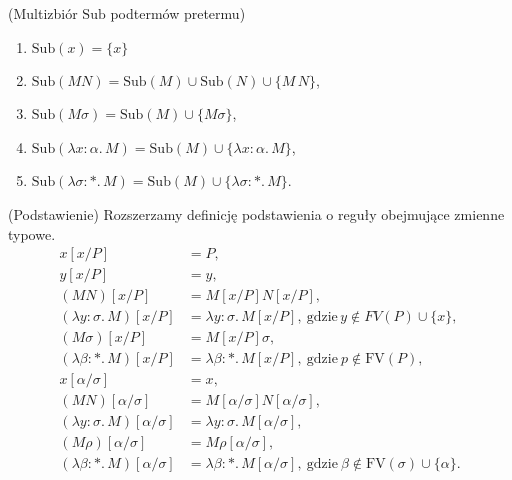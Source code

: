 \begin{definicja}\label{def:f_subterm}(Multizbiór \(\mathrm{Sub}\) podtermów pretermu)
  \begin{enumerate}[label={(\arabic*)}, ref={\arabic*}]
    \setlength\itemsep{0em}
    \item \(\mathrm{Sub}(x)=\{x\}\)\label{def:untyped_subterm_1}    \item \(\mathrm{Sub}(MN)=\mathrm{Sub}(M)\cup\mathrm{Sub}(N)\cup\{M\,N\}\)\label{def:untyped_subterm_2},
    \item \(\mathrm{Sub}(M\sigma)=\mathrm{Sub}(M)\cup\{M\sigma\}\)\label{def:untyped_subterm_2},
    \item \(\mathrm{Sub}(\lambda x:\alpha.\, M) = \mathrm{Sub}(M)\cup \{\lambda x:\alpha.\, M\}\)\label{def:untyped_subterm_3},
    \item \(\mathrm{Sub}(\lambda \sigma:*.\, M) = \mathrm{Sub}(M)\cup \{\lambda \sigma:*.\, M\}\)\label{def:untyped_subterm_3}.
  \end{enumerate}
\end{definicja}

  \begin{definicja}(Podstawienie) Rozszerzamy definicję podstawienia o reguły obejmujące zmienne typowe.
  \begin{align*}
    x[x/P] &= P,\\
    y[x/P] &= y,\\
    (MN)[x/P] &= M[x/P]N[x/P],\\
    (\lambda y:\sigma.\,M)[x/P] &= \lambda y:\sigma.\,M[x/P],\ \text{gdzie}\, y\not\in FV(P)\cup\{x\},\\
    (M\sigma)[x/P] &= M[x/P]\sigma,\\
    (\lambda \beta:*.\,M)[x/P] &= \lambda \beta:*.\,M[x/P],\ \text{gdzie}\ p\not\in\mathrm{FV}(P),\\
    x[\alpha/\sigma]&=x,\\
    (MN)[\alpha/\sigma] &= M[\alpha/\sigma]N[\alpha/\sigma],\\
    (\lambda y:\sigma.\,M)[\alpha/\sigma] &= \lambda y:\sigma.\,M[\alpha/\sigma],\\
    (M\rho)[\alpha/\sigma] &= M\rho[\alpha/\sigma],\\
    (\lambda \beta:*.\,M)[\alpha/\sigma] &= \lambda \beta:*.\,M[\alpha/\sigma],\ \text{gdzie}\ \beta\not\in\mathrm{FV}(\sigma)\cup\{\alpha\}.\\
  \end{align*}
  \end{definicja}

